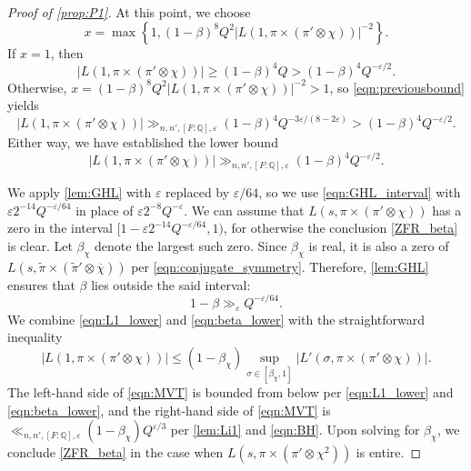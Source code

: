 \documentclass[12pt]{amsart}
\theoremstyle{definition}
\theoremstyle{remark}
\numberwithin{equation}{section}
\theoremstyle{plain}
\renewcommand{\tilde}{\widetilde}
\renewcommand{\bar}{\overline}
\renewcommand{\epsilon}{\varepsilon}
\newcommand{\Q}{\mathbb{Q}}
\begin{document}
\begin{proof}[Proof of \cref{prop:P1}]
At this point, we choose
\[
x = \max\left\{1,(1-\beta)^{8}Q^{2}|L(1,\pi\times(\pi'\otimes\chi))|^{-2}\right\}.
\]
If $x=1$, then
\[
|L(1,\pi\times(\pi'\otimes\chi))|\geq (1-\beta)^4 Q > (1-\beta)^4 Q^{-\epsilon/2}.
\]
Otherwise, $x=(1-\beta)^{8} Q^{2}|L(1,\pi\times(\pi'\otimes\chi))|^{-2}>1$, so \eqref{eqn:previousbound} yields
\[
|L(1,\pi\times(\pi'\otimes\chi))|\gg_{n,n',[F:\Q],\epsilon} (1-\beta)^{4}Q^{-3\epsilon/(8-2\epsilon)}>(1-\beta)^{4}Q^{-\epsilon/2}.
\]
Either way, we have established the lower bound
\begin{equation}
\label{eqn:L1_lower}
|L(1,\pi\times(\pi'\otimes\chi))|\gg_{n,n',[F:\Q],\epsilon}(1-\beta)^{4}Q^{-\epsilon/2}.
\end{equation}

We apply \cref{lem:GHL} with $\epsilon$ replaced by $\epsilon/64$, so we use \eqref{eqn:GHL_interval} with $\epsilon 2^{-14}Q^{-\epsilon/64}$ in place of $\epsilon 2^{-8}Q^{-\epsilon}$.  We can assume that $L(s,\pi\times(\pi'\otimes\chi))$ has a zero in the interval $[1-\epsilon 2^{-14}Q^{-\epsilon/64},1)$, for otherwise the conclusion \eqref{ZFR_beta} is clear. Let $\beta_\chi$ denote the largest such zero.  Since $\beta_\chi$ is real, it is also a zero of $L(s,\tilde\pi\times(\tilde\pi'\otimes\bar{\chi}))$ per \eqref{eqn:conjugate_symmetry}. Therefore, \cref{lem:GHL} ensures that $\beta$ lies outside the said interval:
\begin{equation}
\label{eqn:beta_lower}
1-\beta\gg_\epsilon Q^{-\epsilon/64}.
\end{equation}
We combine \eqref{eqn:L1_lower} and \eqref{eqn:beta_lower} with the straightforward inequality
\begin{equation}
\label{eqn:MVT}
|L(1,\pi\times(\pi'\otimes\chi))|\leq(1-\beta_\chi)\sup_{\sigma\in[\beta_\chi,1]}|L'(\sigma,\pi\times(\pi'\otimes\chi))|.
\end{equation}
The left-hand side of \eqref{eqn:MVT} is bounded from below per \eqref{eqn:L1_lower} and \eqref{eqn:beta_lower}, and the right-hand side of \eqref{eqn:MVT} is $\ll_{n,n',[F:\Q],\epsilon}(1-\beta_\chi) Q^{\epsilon/3}$ per \cref{lem:Li1} and \eqref{eqn:BH}.  Upon solving for $\beta_\chi$, we conclude \eqref{ZFR_beta} in the case when $L(s,\pi\times(\pi'\otimes\chi^2))$ is entire.


\end{proof}
\end{document}
